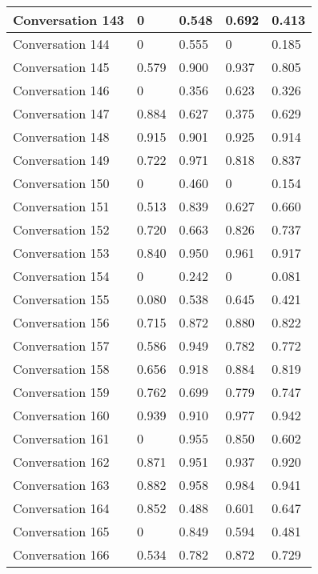 \begin{table}[]
\begin{tabular}{|l|l|l|l|l|}
Conversation 143 & 0        & 0.548 & 0.692       & 0.413   \\ \hline
Conversation 144 & 0        & 0.555 & 0           & 0.185   \\ \hline
Conversation 145 & 0.579    & 0.900 & 0.937       & 0.805   \\ \hline
Conversation 146 & 0        & 0.356 & 0.623       & 0.326   \\ \hline
Conversation 147 & 0.884    & 0.627 & 0.375       & 0.629   \\ \hline
Conversation 148 & 0.915    & 0.901 & 0.925       & 0.914   \\ \hline
Conversation 149 & 0.722    & 0.971 & 0.818       & 0.837   \\ \hline
Conversation 150 & 0        & 0.460 & 0           & 0.154   \\ \hline
Conversation 151 & 0.513    & 0.839 & 0.627       & 0.660   \\ \hline
Conversation 152 & 0.720    & 0.663 & 0.826       & 0.737   \\ \hline
Conversation 153 & 0.840    & 0.950 & 0.961       & 0.917   \\ \hline
Conversation 154 & 0        & 0.242 & 0           & 0.081   \\ \hline
Conversation 155 & 0.080    & 0.538 & 0.645       & 0.421   \\ \hline
Conversation 156 & 0.715    & 0.872 & 0.880       & 0.822   \\ \hline
Conversation 157 & 0.586    & 0.949 & 0.782       & 0.772   \\ \hline
Conversation 158 & 0.656    & 0.918 & 0.884       & 0.819   \\ \hline
Conversation 159 & 0.762    & 0.699 & 0.779       & 0.747   \\ \hline
Conversation 160 & 0.939    & 0.910 & 0.977       & 0.942   \\ \hline
Conversation 161 & 0        & 0.955 & 0.850       & 0.602   \\ \hline
Conversation 162 & 0.871    & 0.951 & 0.937       & 0.920   \\ \hline
Conversation 163 & 0.882    & 0.958 & 0.984       & 0.941   \\ \hline
Conversation 164 & 0.852    & 0.488 & 0.601       & 0.647   \\ \hline
Conversation 165 & 0        & 0.849 & 0.594       & 0.481   \\ \hline
Conversation 166 & 0.534    & 0.782 & 0.872       & 0.729   \\ \hline

\end{tabular}
\end{table}
